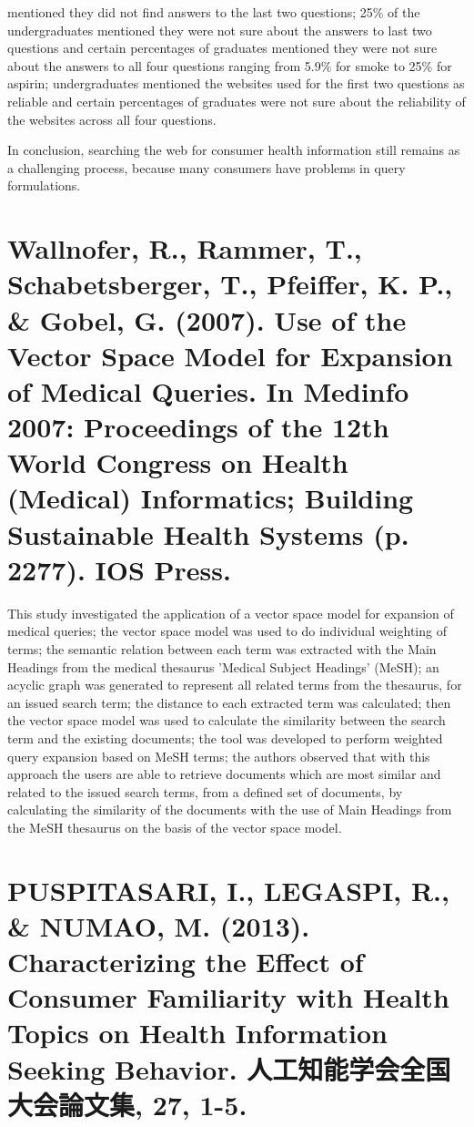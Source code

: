 \documentclass[]{article}
\begin{document}
mentioned they did not find answers to the last two questions; 25\% of the undergraduates mentioned they were not sure about the answers to last two questions and certain percentages of graduates mentioned they were not sure about the answers to all four questions ranging from 5.9\% for smoke to 25\% for aspirin; undergraduates mentioned  the websites used for the first two questions as reliable and certain percentages of graduates were not sure about the reliability of the websites across all four questions.         

In conclusion, searching the web for consumer health information still remains as a challenging process, because many consumers have problems in query formulations. 

\section{Wallnofer, R., Rammer, T., Schabetsberger, T., Pfeiffer, K. P., \& Gobel, G. (2007). Use of the Vector Space Model for Expansion of Medical Queries. In Medinfo 2007: Proceedings of the 12th World Congress on Health (Medical) Informatics; Building Sustainable Health Systems (p. 2277). IOS Press.}

This study investigated the application of a vector space model for expansion of medical queries; the vector space model was used to do individual weighting of terms; the semantic relation between each term was extracted with the Main Headings from the medical thesaurus 'Medical Subject Headings' (MeSH); an acyclic graph was generated to represent all related terms from the thesaurus, for an issued search term; the distance to each extracted term was calculated; then the vector space model was used to calculate the similarity between the search term and the existing documents; the tool was developed to perform weighted query expansion based on MeSH terms; the authors observed that with this approach the users are able to retrieve documents which are most similar and related to the issued search terms, from a defined set of documents, by calculating the similarity of the documents with the use of Main Headings from the MeSH thesaurus on the basis of the vector space model.    

\section{PUSPITASARI, I., LEGASPI, R., \& NUMAO, M. (2013). Characterizing the Effect of Consumer Familiarity with Health Topics on Health Information Seeking Behavior. 人工知能学会全国大会論文集, 27, 1-5.}
\end{document}

